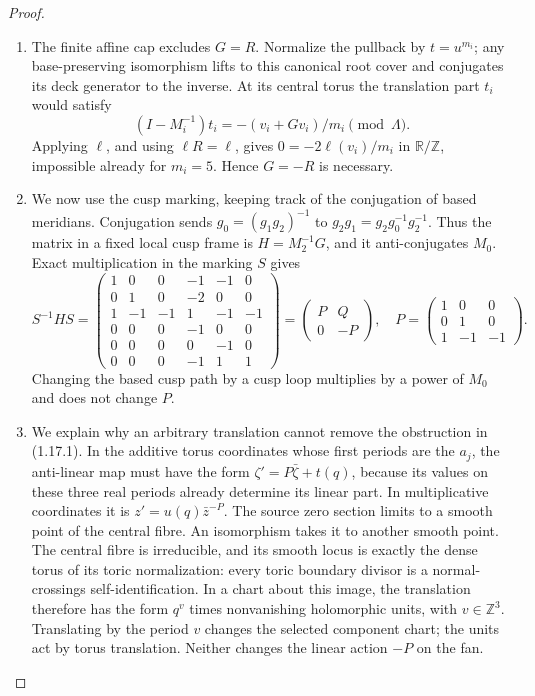 \begin{proof}
\begin{enumerate}[label={$\langle1\rangle$\arabic*.}]
\item The finite affine cap excludes $G=R$.  Normalize the pullback by
$t=u^{m_i}$; any base-preserving isomorphism lifts to this canonical
root cover and conjugates its deck generator to the inverse.
At its central torus the translation part $t_i$ would satisfy
\[
(I-M_i^{-1})t_i=-(v_i+Gv_i)/m_i\pmod\Lambda.
\]
Applying $\ell$, and using $\ell R=\ell$, gives
$0=-2\ell(v_i)/m_i$ in $\mathbb R/\mathbb Z$, impossible already
for $m_i=5$.  Hence $G=-R$ is necessary.

\item We now use the cusp marking, keeping track of the conjugation of based meridians.  Conjugation sends
$g_0=(g_1g_2)^{-1}$ to $g_2g_1=g_2g_0^{-1}g_2^{-1}$.
Thus the matrix in a fixed local cusp frame is
$H=M_2^{-1}G$, and it anti-conjugates $M_0$.
Exact multiplication in the marking $S$ gives
\[
S^{-1}HS=
\begin{pmatrix}
1&0&0&-1&-1&0\\
0&1&0&-2&0&0\\
1&-1&-1&1&-1&-1\\
0&0&0&-1&0&0\\
0&0&0&0&-1&0\\
0&0&0&-1&1&1
\end{pmatrix}
=\begin{pmatrix}P&Q\\0&-P\end{pmatrix},\quad
P=\begin{pmatrix}1&0&0\\0&1&0\\1&-1&-1\end{pmatrix}.
\tag{1.17.1}
\]
Changing the based cusp path by a cusp loop multiplies by a power of
$M_0$ and does not change $P$.

\item We explain why an arbitrary translation cannot remove the obstruction
in (1.17.1).  In the additive torus coordinates whose first periods
are the $a_j$, the anti-linear map must have the form
$\zeta' =P\bar\zeta+t(q)$, because its values on these three real
periods already determine its linear part.  In multiplicative
coordinates it is
$z'=u(q)\bar z^{-P}$.
The source zero section limits to a smooth point of the central fibre.
An isomorphism takes it to another smooth point.  The central fibre
is irreducible, and its smooth locus is exactly the dense torus of
its toric normalization: every toric boundary divisor is a
normal-crossings self-identification.  In a chart about this image,
the translation therefore has the form $q^v$ times nonvanishing
holomorphic units, with $v\in\mathbb Z^3$.  Translating by the period
$v$ changes the selected component chart; the units act by torus
translation.  Neither changes the linear action $-P$ on the fan.


\end{enumerate}
\end{proof}
